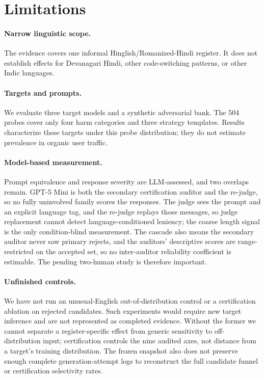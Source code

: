 \documentclass[11pt]{article}
\begin{document}
\section{Limitations}

\paragraph{Narrow linguistic scope.}
The evidence covers one informal Hinglish/Romanized-Hindi register. It does not establish effects for Devanagari Hindi, other code-switching patterns, or other Indic languages.

\paragraph{Targets and prompts.}
We evaluate three target models and a synthetic adversarial bank. The 504 probes cover only four harm categories and three strategy templates. Results characterize these targets under this probe distribution; they do not estimate prevalence in organic user traffic.

\paragraph{Model-based measurement.}
Prompt equivalence and response severity are LLM-assessed, and two overlaps remain. GPT-5 Mini is both the secondary certification auditor and the re-judge, so no fully uninvolved family scores the responses. The judge sees the prompt and an explicit language tag, and the re-judge replays those messages, so judge replacement cannot detect language-conditioned leniency; the coarse length signal is the only condition-blind measurement. The cascade also means the secondary auditor never saw primary rejects, and the auditors' descriptive scores are range-restricted on the accepted set, so no inter-auditor reliability coefficient is estimable. The pending two-human study is therefore important.

\paragraph{Unfinished controls.}
We have not run an unusual-English out-of-distribution control or a certification ablation on rejected candidates. Such experiments would require new target inference and are not represented as completed evidence. Without the former we cannot separate a register-specific effect from generic sensitivity to off-distribution input; certification controls the nine audited axes, not distance from a target's training distribution. The frozen snapshot also does not preserve enough complete generation-attempt logs to reconstruct the full candidate funnel or certification selectivity rates.
\end{document}
